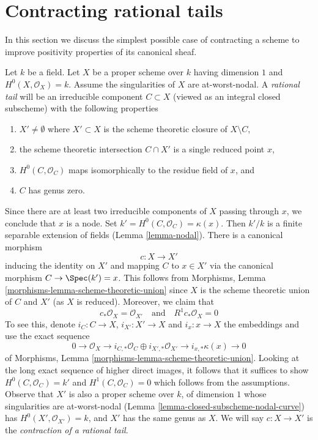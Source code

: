 \section{Contracting rational tails}
\label{section-contracting-rational-tails}

\noindent
In this section we discuss the simplest possible case of contracting
a scheme to improve positivity properties of its canonical sheaf.

\begin{example}
\label{example-rational-tail}
Let $k$ be a field. Let $X$ be a proper scheme over $k$ having dimension $1$
and $H^0(X, \mathcal{O}_X) = k$. Assume the singularities of $X$ are
at-worst-nodal.
A {\it rational tail} will be an irreducible component $C \subset X$
(viewed as an integral closed subscheme) with the following properties
\begin{enumerate}
\item $X' \not = \emptyset$ where $X' \subset X$ is the scheme theoretic closure
of $X \setminus C$,
\item the scheme theoretic intersection $C \cap X'$ is a single
reduced point $x$,
\item $H^0(C, \mathcal{O}_C)$ maps isomorphically to the
residue field of $x$, and
\item $C$ has genus zero.
\end{enumerate}
Since there are at least two irreducible components of $X$ passing through
$x$, we conclude that $x$ is a node.
Set $k' = H^0(C, \mathcal{O}_C) = \kappa(x)$.
Then $k'/k$ is a finite separable extension of fields
(Lemma \ref{lemma-nodal}). There is a canonical morphism
$$
c : X \longrightarrow X'
$$
inducing the identity on $X'$ and mapping $C$ to $x \in X'$
via the canonical morphism $C \to \Spec(k') = x$. This follows from
Morphisms, Lemma \ref{morphisms-lemma-scheme-theoretic-union}
since $X$ is the scheme theoretic union of $C$ and $X'$ (as $X$ is reduced).
Moreover, we claim that
$$
c_*\mathcal{O}_X = \mathcal{O}_{X'}
\quad\text{and}\quad
R^1c_*\mathcal{O}_X = 0
$$
To see this, denote $i_C : C \to X$, $i_{X'} : X' \to X$ and $i_x : x \to X$
the embeddings and use the exact sequence
$$
0 \to \mathcal{O}_X \to
i_{C, *}\mathcal{O}_C \oplus i_{X', *}\mathcal{O}_{X'} \to
i_{x, *}\kappa(x) \to 0
$$
of Morphisms, Lemma \ref{morphisms-lemma-scheme-theoretic-union}.
Looking at the long exact sequence of higher direct images,
it follows that it suffices to show $H^0(C, \mathcal{O}_C) = k'$
and $H^1(C, \mathcal{O}_C) = 0$ which follows from the assumptions.
Observe that $X'$ is also a proper scheme over $k$, of dimension $1$
whose singularities are at-worst-nodal
(Lemma \ref{lemma-closed-subscheme-nodal-curve})
has $H^0(X', \mathcal{O}_{X'}) = k$, and
$X'$ has the same genus as $X$.
We will say $c : X \to X'$ is the
{\it contraction of a rational tail}.
\end{example}

